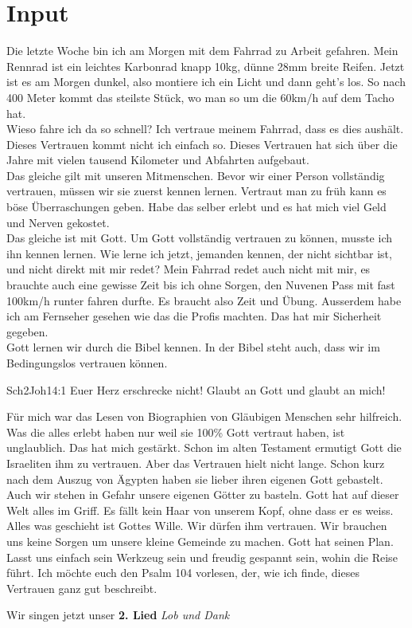 \documentclass[12pt,a4paper]{scrarticle}
\begin{document}
\section{ Input }
\begin{spacing}{1.5}
Die letzte Woche bin ich am Morgen mit dem Fahrrad zu Arbeit gefahren. Mein Rennrad ist ein leichtes Karbonrad knapp 10kg, dünne 28mm breite Reifen. Jetzt ist es am Morgen dunkel, also montiere ich ein Licht und dann geht's los. So nach 400 Meter kommt das steilste Stück, wo man so um die 60km/h auf dem Tacho hat. \\
Wieso fahre ich da so schnell? Ich vertraue meinem Fahrrad, dass es dies aushält. Dieses Vertrauen kommt nicht ich einfach so. Dieses Vertrauen hat sich über die Jahre mit vielen tausend Kilometer und Abfahrten aufgebaut. \\
Das gleiche gilt mit unseren Mitmenschen. Bevor wir einer Person vollständig vertrauen, müssen wir sie zuerst kennen lernen. Vertraut man zu früh kann es böse Überraschungen geben. Habe das selber erlebt und es hat mich viel Geld und Nerven gekostet.  \\
Das gleiche ist mit Gott. Um Gott vollständig vertrauen zu können, musste ich ihn kennen lernen. Wie lerne ich jetzt, jemanden kennen, der nicht sichtbar ist, und nicht direkt mit mir redet? Mein Fahrrad redet auch nicht mit mir, es brauchte auch eine gewisse Zeit bis ich ohne Sorgen, den Nuvenen Pass mit fast 100km/h runter fahren durfte. Es braucht also Zeit und Übung. Ausserdem habe ich am Fernseher gesehen wie das die Profis machten. Das hat mir Sicherheit gegeben. \\
Gott lernen wir durch die Bibel kennen. In der Bibel steht auch, dass wir im Bedingungslos vertrauen können.
\begin{bibeltext}{Sch2}{Joh}{14:1}
Euer Herz erschrecke nicht! Glaubt an Gott und glaubt an mich!
\end{bibeltext}
Für mich war das Lesen von Biographien von Gläubigen Menschen sehr hilfreich. Was die alles erlebt haben nur weil sie 100\% Gott vertraut haben, ist unglaublich. Das hat mich gestärkt.
Schon im alten Testament ermutigt Gott die Israeliten ihm zu vertrauen. Aber das Vertrauen hielt nicht lange. Schon kurz nach dem Auszug von Ägypten haben sie lieber ihren eigenen Gott gebastelt. \\
Auch wir stehen in Gefahr unsere eigenen Götter zu basteln. Gott hat auf dieser Welt alles im Griff. Es fällt kein Haar von unserem Kopf, ohne dass er es weiss. Alles was geschieht ist Gottes Wille. Wir dürfen ihm vertrauen. Wir brauchen uns keine Sorgen um unsere kleine Gemeinde zu machen. Gott hat seinen Plan. Lasst uns einfach sein Werkzeug sein und freudig gespannt sein, wohin die Reise führt.
Ich möchte euch den Psalm 104 vorlesen, der, wie ich finde, dieses Vertrauen ganz gut beschreibt.

\end{spacing}
Wir singen jetzt unser \textbf{2. Lied} \textit{Lob und Dank}
\end{document}
